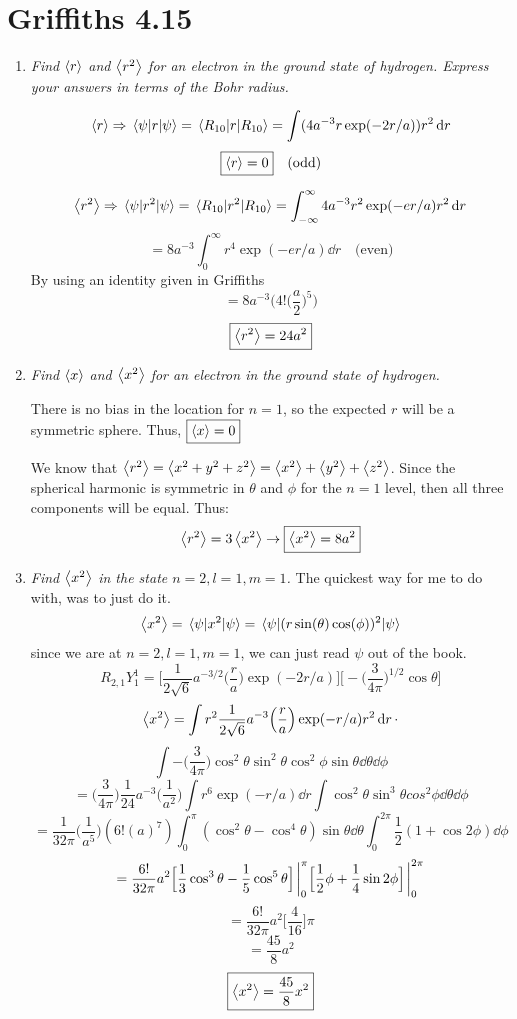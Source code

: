 \documentclass[12pt]{article}
\begin{document}
\section*{Griffiths 4.15}
\begin{enumerate}[label=\alph*)]
\item {\sl Find $\ev{r}$ and $\ev{r^2}$ for an electron in the ground state of hydrogen. Express your answers in terms of the Bohr radius.}

\[\ev{r} \Rightarrow \ev{r}{\psi} = \ev{r}{R_{10}} = \int(4a^{-3}r\exp(-2r/a))r^2\dd{r}\]
\[\boxed{\ev{r} = 0} \quad \text{(odd)}\]

\[\ev{r^2} \Rightarrow \ev{r^2}{\psi} = \ev{r^2}{R_{10}} = \int_{-\infty}^\infty 4a^{-3}r^2 \exp(-er/a)r^2\dd{r} \]
\[ = 8a^{-3}\int_0^\infty r^4 \exp(-er/a) \dd{r} \quad \text{(even)}\]
By using an identity given in Griffiths
\[= 8a^{-3}\Big(4!\Big(\frac{a}{2}\Big)^5\Big)\]
\[\boxed{\ev{r^2} = 24 a^2}\]

\item {\sl Find $\ev{x}$ and $\ev{x^2}$ for an electron in the ground state of hydrogen.}

There is no bias in the location for $n=1$, so the expected $r$ will be a symmetric sphere. Thus, $\boxed{\ev{x} = 0}$

We know that $\ev{r^2} = \ev{x^2 + y^2 + z^2} = \ev{x^2} + \ev{y^2} + \ev{z^2}$. Since the spherical harmonic is symmetric in $\theta$ and $\phi$ for the $n=1$ level, then all three components will be equal. Thus:
\[\ev{r^2} = 3\ev{x^2} \rightarrow \boxed{\ev{x^2} = 8a^2}\]

\item {\sl Find $\ev{x^2}$ in the state $n=2, l=1, m=1$.}
The quickest way for me to do with, was to just do it. 
\[\ev{x^2} = \ev{x^2}{\psi} = \ev{(r\sin(\theta)\cos(\phi))^2}{\psi}\]
since we are at $n=2,l=1,m=1$, we can just read $\psi$ out of the book. 
\[R_{2,1}Y^1_1 = \Big[\frac{1}{2\sqrt{6}}a^{-3/2}\Big(\frac{r}{a}\Big)\exp(-2r/a)\Big]
\Big[-\Big(\frac{3}{4\pi}\Big)^{1/2}\cos\theta \Big]\]\smallskip
\[\ev{x^2} = \int r^2 \frac{1}{2\sqrt{6}}a^{-3}\Big(\frac{r}{a}\Big)\exp(-r/a) r^2 \dd{r} \cdot\]
\[\int -\Big(\frac{3}{4\pi}\Big)\cos^2\theta \sin^2 \theta \cos^2\phi \sin\theta \dd{\theta} \dd{\phi}\]
\[= \Big(\frac{3}{4 \pi}\Big)\frac{1}{24}a^{-3}\Big(\frac{1}{a^2}\Big)\int r^6 \exp(-r/a)\dd{r} \int \cos^2 \theta \sin^3 \theta cos^2 \phi \dd{\theta} \dd{\phi}\]
\[= \frac{1}{32 \pi}\Big(\frac{1}{a^5}\Big)(6!(a)^7) \int^{\pi}_0 (\cos^2 \theta - \cos^4 \theta)\sin \theta \dd{\theta} \int^{2 \pi}_0 \frac{1}{2}(1 + \cos 2\phi) \dd{\phi}\]
\[= \frac{6!}{32 \pi}a^2 \Big[\frac{1}{3}\cos^3 \theta - \frac{1}{5} \cos^5 \theta\Big]\eval_0^\pi \Big[\frac{1}{2}\phi + \frac{1}{4}\sin 2\phi\Big]\eval_0^{2\pi}\]
\[= \frac{6!}{32 \pi}a^2 \Big[\frac{4}{16}\Big]\pi\]
\[= \frac{45}{8}a^2\]
\[\boxed{\ev{x^2} = \frac{45}{8}x^2}\]

\end{enumerate}
\end{document}
